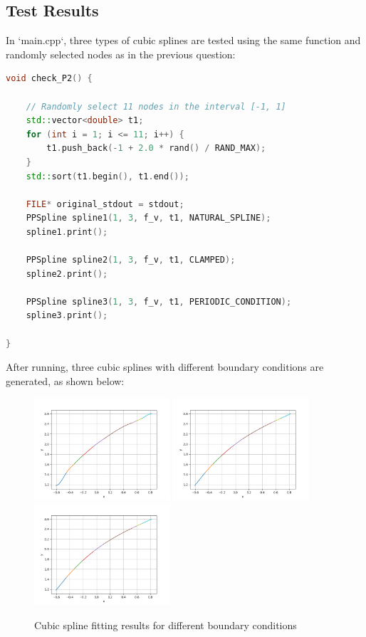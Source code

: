\documentclass[a4paper]{article}
\begin{document}
\subsection{Test Results}
In `main.cpp`, three types of cubic splines are tested using the same function and randomly selected nodes as in the previous question:
\begin{lstlisting}[language=C++]
void check_P2() {

    // Randomly select 11 nodes in the interval [-1, 1]
    std::vector<double> t1;
    for (int i = 1; i <= 11; i++) {
        t1.push_back(-1 + 2.0 * rand() / RAND_MAX);
    }
    std::sort(t1.begin(), t1.end()); 
    
    FILE* original_stdout = stdout;
    PPSpline spline1(1, 3, f_v, t1, NATURAL_SPLINE);
    spline1.print();

    PPSpline spline2(1, 3, f_v, t1, CLAMPED);
    spline2.print();

    PPSpline spline3(1, 3, f_v, t1, PERIODIC_CONDITION);
    spline3.print();

}
\end{lstlisting}
After running, three cubic splines with different boundary conditions are generated, as shown below:
\begin{figure}[H]
    \centering
    \includegraphics[width=0.45\textwidth]{./figure/check/P2_s23_clamped.png}
    \includegraphics[width=0.45\textwidth]{./figure/check/P2_s23_natural.png}
    \includegraphics[width=0.45\textwidth]{./figure/check/P2_s23_periodic.png}
    \caption{Cubic spline fitting results for different boundary conditions}
\end{figure}
\end{document}
